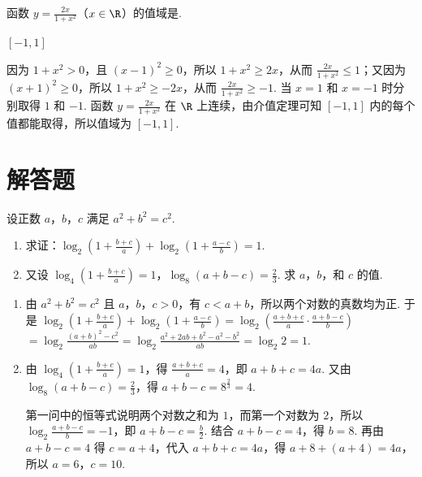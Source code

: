 \begin{problem}
函数 \(y=\frac{2x}{1+x^{2}}\)（\(x\in\R\)）的值域是\fillinblank{}.
\end{problem}

\begin{answer}\([-1,1]\)\end{answer}

\begin{solution}
因为 \(1+x^{2}>0\)，且 \((x-1)^{2}\geqslant0\)，所以 \(1+x^{2}\geqslant2x\)，从而 \(\frac{2x}{1+x^{2}}\leqslant1\)；又因为 \((x+1)^{2}\geqslant0\)，所以 \(1+x^{2}\geqslant-2x\)，从而 \(\frac{2x}{1+x^{2}}\geqslant-1\). 当 \(x=1\) 和 \(x=-1\) 时分别取得 \(1\) 和 \(-1\). 函数 \(y=\frac{2x}{1+x^{2}}\) 在 \(\R\) 上连续，由介值定理可知 \([-1,1]\) 内的每个值都能取得，所以值域为 \([-1,1]\).
\end{solution}

\section{解答题}

\begin{problem}
设正数 \(a\)，\(b\)，\(c\) 满足 \(a^{2}+b^{2}=c^{2}\).
\begin{enumerate}
\item 求证：\(\log_{2}\left(1+\frac{b+c}{a}\right)+\log_{2}\left(1+\frac{a-c}{b}\right)=1\).
\item 又设 \(\log_{4}\left(1+\frac{b+c}{a}\right)=1\)，\(\log_{8}(a+b-c)=\frac23\). 求 \(a\)，\(b\)，和 \(c\) 的值.
\end{enumerate}
\end{problem}

\begin{solution}
\begin{enumerate}
\item
由 \(a^{2}+b^{2}=c^{2}\) 且 \(a\)，\(b\)，\(c>0\)，有 \(c<a+b\)，所以两个对数的真数均为正. 于是
\(\log_{2}\left(1+\frac{b+c}{a}\right)+\log_{2}\left(1+\frac{a-c}{b}\right)=\log_{2}\left(\frac{a+b+c}{a}\cdot\frac{a+b-c}{b}\right)\)
\(=\log_{2}\frac{(a+b)^{2}-c^{2}}{ab}=\log_{2}\frac{a^{2}+2ab+b^{2}-a^{2}-b^{2}}{ab}=\log_{2}2=1\).

\item
由 \(\log_{4}\left(1+\frac{b+c}{a}\right)=1\)，得 \(\frac{a+b+c}{a}=4\)，即 \(a+b+c=4a\). 又由 \(\log_{8}(a+b-c)=\frac23\)，得 \(a+b-c=8^{\frac{2}{3}}=4\).

第一问中的恒等式说明两个对数之和为 \(1\)，而第一个对数为 \(2\)，所以 \(\log_{2}\frac{a+b-c}{b}=-1\)，即 \(a+b-c=\frac b2\). 结合 \(a+b-c=4\)，得 \(b=8\). 再由 \(a+b-c=4\) 得 \(c=a+4\)，代入 \(a+b+c=4a\)，得 \(a+8+(a+4)=4a\)，所以 \(a=6\)，\(c=10\).
\end{enumerate}
\end{solution}

